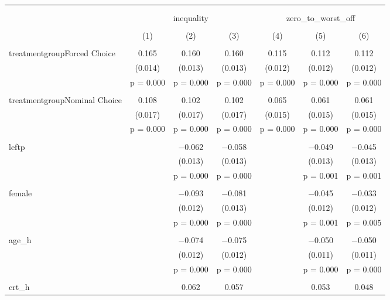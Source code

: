 
\begin{table}[!htbp] \centering 
  \caption{} 
  \label{} 
\begin{tabular}{@{\extracolsep{5pt}}lcccccc} 
\\[-1.8ex]\hline 
\hline \\[-1.8ex] 
\\[-1.8ex] & \multicolumn{3}{c}{inequality} & \multicolumn{3}{c}{zero\_to\_worst\_off} \\ 
\\[-1.8ex] & (1) & (2) & (3) & (4) & (5) & (6)\\ 
\hline \\[-1.8ex] 
 treatmentgroupForced Choice & 0.165 & 0.160 & 0.160 & 0.115 & 0.112 & 0.112 \\ 
  & (0.014) & (0.013) & (0.013) & (0.012) & (0.012) & (0.012) \\ 
  & p = 0.000 & p = 0.000 & p = 0.000 & p = 0.000 & p = 0.000 & p = 0.000 \\ 
  & & & & & & \\ 
 treatmentgroupNominal Choice & 0.108 & 0.102 & 0.102 & 0.065 & 0.061 & 0.061 \\ 
  & (0.017) & (0.017) & (0.017) & (0.015) & (0.015) & (0.015) \\ 
  & p = 0.000 & p = 0.000 & p = 0.000 & p = 0.000 & p = 0.000 & p = 0.000 \\ 
  & & & & & & \\ 
 leftp &  & $-$0.062 & $-$0.058 &  & $-$0.049 & $-$0.045 \\ 
  &  & (0.013) & (0.013) &  & (0.013) & (0.013) \\ 
  &  & p = 0.000 & p = 0.000 &  & p = 0.001 & p = 0.001 \\ 
  & & & & & & \\ 
 female &  & $-$0.093 & $-$0.081 &  & $-$0.045 & $-$0.033 \\ 
  &  & (0.012) & (0.013) &  & (0.012) & (0.012) \\ 
  &  & p = 0.000 & p = 0.000 &  & p = 0.001 & p = 0.005 \\ 
  & & & & & & \\ 
 age\_h &  & $-$0.074 & $-$0.075 &  & $-$0.050 & $-$0.050 \\ 
  &  & (0.012) & (0.012) &  & (0.011) & (0.011) \\ 
  &  & p = 0.000 & p = 0.000 &  & p = 0.000 & p = 0.000 \\ 
  & & & & & & \\ 
 crt\_h &  & 0.062 & 0.057 &  & 0.053 & 0.048 \\ 

\end{tabular}
\end{table}
